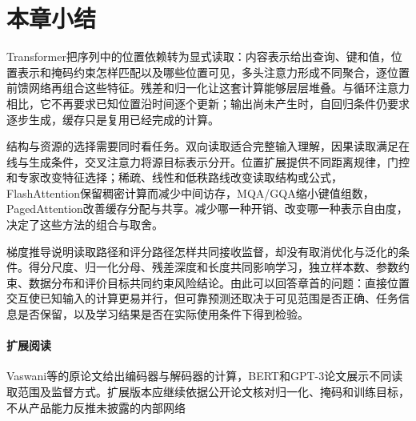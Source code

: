 \Needspace{125mm}
\section{本章小结}
\label{sec:transformer-summary}

Transformer把序列中的位置依赖转为显式读取：内容表示给出查询、键和值，位置表示和掩码约束怎样匹配以及哪些位置可见，多头注意力形成不同聚合，逐位置前馈网络再组合这些特征。残差和归一化让这套计算能够层层堆叠。与循环注意力相比，它不再要求已知位置沿时间逐个更新；输出尚未产生时，自回归条件仍要求逐步生成，缓存只是复用已经完成的计算。

结构与资源的选择需要同时看任务。双向读取适合完整输入理解，因果读取满足在线与生成条件，交叉注意力将源目标表示分开。位置扩展提供不同距离规律，门控和专家改变特征选择；稀疏、线性和低秩路线改变读取结构或公式，FlashAttention保留稠密计算而减少中间访存，MQA/GQA缩小键值组数，PagedAttention改善缓存分配与共享。减少哪一种开销、改变哪一种表示自由度，决定了这些方法的组合与取舍。

梯度推导说明读取路径和评分路径怎样共同接收监督，却没有取消优化与泛化的条件。得分尺度、归一化分母、残差深度和长度共同影响学习，独立样本数、参数约束、数据分布和评价目标共同约束风险结论。由此可以回答章首的问题：直接位置交互使已知输入的计算更易并行，但可靠预测还取决于可见范围是否正确、任务信息是否保留，以及学习结果是否在实际使用条件下得到检验。

\paragraph{扩展阅读}
Vaswani等的原论文给出编码器与解码器的计算，BERT和GPT-3论文展示不同读取范围及监督方式。扩展版本应继续依据公开论文核对归一化、掩码和训练目标，不从产品能力反推未披露的内部网络
